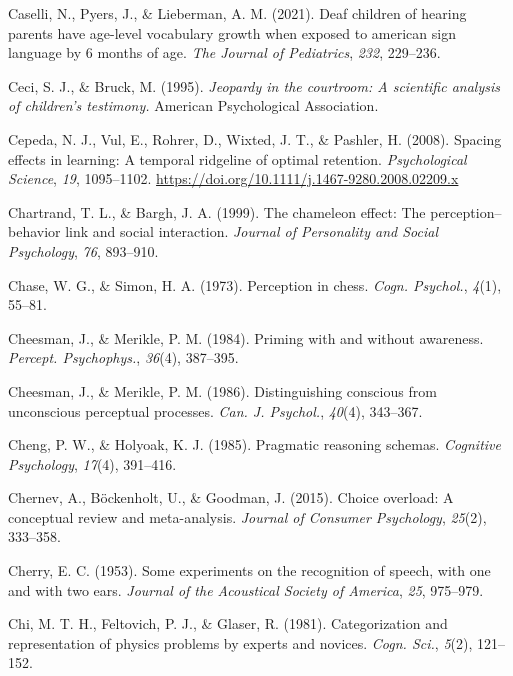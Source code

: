 \documentclass[
]{krantz}
\newlength{\cslhangindent}
\newenvironment{CSLReferences}[2] %
 {\begin{list}{}{%
  \setlength{\itemindent}{0pt}
  \setlength{\leftmargin}{0pt}
  \setlength{\parsep}{0pt}
  \ifodd #1
   \setlength{\leftmargin}{\cslhangindent}
   \setlength{\itemindent}{-1\cslhangindent}
  \fi
  \setlength{\itemsep}{#2\baselineskip}}}
 {\end{list}}
\begin{document}
\begin{CSLReferences}{1}{0}
Caselli, N., Pyers, J., \& Lieberman, A. M. (2021). Deaf children of hearing parents have age-level vocabulary growth when exposed to american sign language by 6 months of age. \emph{The Journal of Pediatrics}, \emph{232}, 229--236.

Ceci, S. J., \& Bruck, M. (1995). \emph{Jeopardy in the courtroom: A scientific analysis of children's testimony.} American Psychological Association.

Cepeda, N. J., Vul, E., Rohrer, D., Wixted, J. T., \& Pashler, H. (2008). Spacing effects in learning: A temporal ridgeline of optimal retention. \emph{Psychological Science}, \emph{19}, 1095--1102. \url{https://doi.org/10.1111/j.1467-9280.2008.02209.x}

Chartrand, T. L., \& Bargh, J. A. (1999). The chameleon effect: The perception--behavior link and social interaction. \emph{Journal of Personality and Social Psychology}, \emph{76}, 893--910.

Chase, W. G., \& Simon, H. A. (1973). Perception in chess. \emph{Cogn. Psychol.}, \emph{4}(1), 55--81.

Cheesman, J., \& Merikle, P. M. (1984). Priming with and without awareness. \emph{Percept. Psychophys.}, \emph{36}(4), 387--395.

Cheesman, J., \& Merikle, P. M. (1986). Distinguishing conscious from unconscious perceptual processes. \emph{Can. J. Psychol.}, \emph{40}(4), 343--367.

Cheng, P. W., \& Holyoak, K. J. (1985). Pragmatic reasoning schemas. \emph{Cognitive Psychology}, \emph{17}(4), 391--416.

Chernev, A., Böckenholt, U., \& Goodman, J. (2015). Choice overload: A conceptual review and meta-analysis. \emph{Journal of Consumer Psychology}, \emph{25}(2), 333--358.

Cherry, E. C. (1953). Some experiments on the recognition of speech, with one and with two ears. \emph{Journal of the Acoustical Society of America}, \emph{25}, 975--979.

Chi, M. T. H., Feltovich, P. J., \& Glaser, R. (1981). Categorization and representation of physics problems by experts and novices. \emph{Cogn. Sci.}, \emph{5}(2), 121--152.


\end{CSLReferences}
\end{document}
